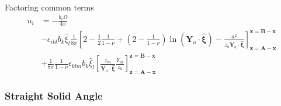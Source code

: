 Factoring common terms
\begin{align}
 u_i &=-\frac{ b_i\Omega}{4\pi}\nonumber\\
 &-\epsilon_{ikl}b_k\hat{\xi}_l\frac{1}{8\pi}\left[2-\frac{1}{2}\frac{1}{1-\nu}+ \left(2-\frac{1}{1-\nu}\right)\ln\left(\bm Y_a \cdot \hat{\bm \xi}\right)-\frac{a^2}{z_a \bm Y_a \cdot \hat{\bm \xi}}
 \right]^{\bm z=\bm B-\bm x}_{\bm z=\bm A-\bm x}  \nonumber\\
 &+\frac{1}{8\pi}\frac{1}{1-\nu} \epsilon_{klm}b_k\hat{\xi}_l\left[
 \frac{z_m}{ \bm Y_a \cdot \hat{\bm \xi}}\frac{Y_{ai}}{z_a} \right]^{\bm z=\bm B-\bm x}_{\bm z=\bm A-\bm x}
\end{align}

\subsubsection{Straight Solid Angle}

